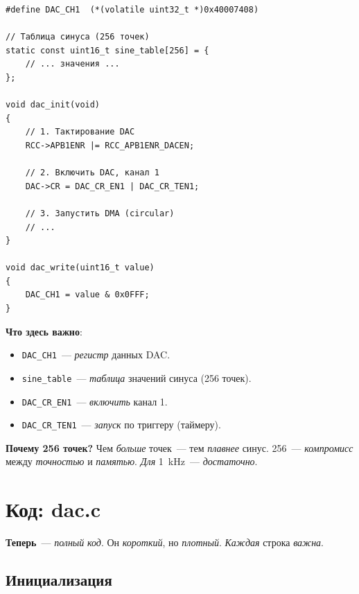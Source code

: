 \begin{listing}[htbp]
\begin{verbatim}
#define DAC_CH1  (*(volatile uint32_t *)0x40007408)

// Таблица синуса (256 точек)
static const uint16_t sine_table[256] = {
    // ... значения ...
};

void dac_init(void)
{
    // 1. Тактирование DAC
    RCC->APB1ENR |= RCC_APB1ENR_DACEN;

    // 2. Включить DAC, канал 1
    DAC->CR = DAC_CR_EN1 | DAC_CR_TEN1;

    // 3. Запустить DMA (circular)
    // ...
}

void dac_write(uint16_t value)
{
    DAC_CH1 = value & 0x0FFF;
}
\end{verbatim}
\caption{\texttt{dac\_init()} и \texttt{dac\_write()}}
\label{lst:gen-dac}
\end{listing}

\textbf{Что здесь важно}:
\begin{itemize}
    \item \texttt{DAC\_CH1}~--- \emph{регистр} данных DAC.
    \item \texttt{sine\_table}~--- \emph{таблица} значений
          синуса (\num{256} точек).
    \item \texttt{DAC\_CR\_EN1}~--- \emph{включить} канал 1.
    \item \texttt{DAC\_CR\_TEN1}~--- \emph{запуск} по
          триггеру (таймеру).
\end{itemize}

\begin{keybox}
\textbf{Почему \num{256} точек?} Чем \emph{больше}
точек~--- тем \emph{плавнее} синус. \num{256}~---
\emph{компромисс} между \emph{точностью} и \emph{памятью}.
\emph{Для} \SI{1}{\kilo\hertz}~--- \emph{достаточно}.
\end{keybox}





\section{Код: dac.c}
\label{sec:gen-code-full}

\textbf{Теперь}~--- \emph{полный} \emph{код}. Он \emph{короткий},
но \emph{плотный}. \emph{Каждая} строка \emph{важна}.

\subsection{Инициализация}

